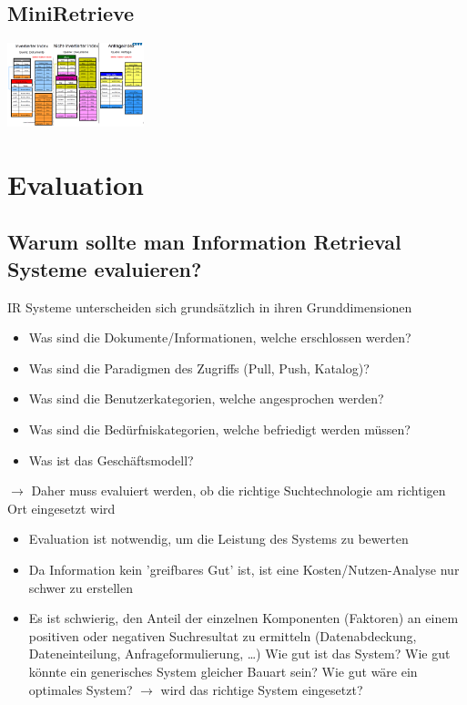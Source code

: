 \documentclass{report}
\newenvironment{Figure}
	{\par\medskip\noindent\minipage{\linewidth}}
	{\endminipage\par\medskip}
\theoremstyle{definition}
\theoremstyle{example}
\begin{document}
\section{MiniRetrieve}

\begin{Figure}
   \centering
    \includegraphics[width=150px]{img/ArchitekturMiniRetrieve.png}
        \label{fig:Abbildung der Architektur des Mini Retrieves}
\end{Figure}

\chapter{Evaluation}

\section{Warum sollte man Information Retrieval Systeme evaluieren?}

IR Systeme unterscheiden sich grundsätzlich in ihren Grunddimensionen

\begin{itemize}
   \item Was sind die Dokumente/Informationen, welche erschlossen werden?
   \item Was sind die Paradigmen des Zugriffs (Pull, Push, Katalog)?
   \item Was sind die Benutzerkategorien, welche angesprochen werden?
   \item Was sind die Bedürfniskategorien, welche befriedigt werden müssen?
   \item Was ist das Geschäftsmodell?
\end{itemize}

$\rightarrow$ Daher muss evaluiert werden, ob die richtige Suchtechnologie am richtigen Ort eingesetzt wird

\begin{itemize}
   \item Evaluation ist notwendig, um die Leistung des Systems zu bewerten
   \item Da Information kein 'greifbares Gut' ist, ist eine Kosten/Nutzen-Analyse nur schwer zu erstellen
   \item Es ist schwierig, den Anteil der einzelnen Komponenten (Faktoren) an einem positiven oder negativen Suchresultat zu ermitteln (Datenabdeckung, Dateneinteilung, Anfrageformulierung, \dots)
   \subitem Wie gut ist das System?
   \subitem Wie gut könnte ein generisches System gleicher Bauart sein?
   \subitem Wie gut wäre ein optimales System?
   \subitem $\rightarrow$ wird das richtige System eingesetzt? 
\end{itemize}
\end{document}
